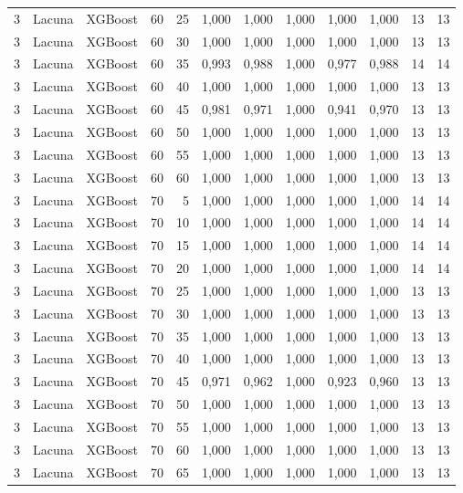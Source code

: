 \begin{longtable}{@{}rllrrrrrrrrr@{}}
3 & Lacuna & XGBoost & 60 & 25 & 1,000 & 1,000 & 1,000 & 1,000 & 1,000 & 13 & 13 \\
3 & Lacuna & XGBoost & 60 & 30 & 1,000 & 1,000 & 1,000 & 1,000 & 1,000 & 13 & 13 \\
3 & Lacuna & XGBoost & 60 & 35 & 0,993 & 0,988 & 1,000 & 0,977 & 0,988 & 14 & 14 \\
3 & Lacuna & XGBoost & 60 & 40 & 1,000 & 1,000 & 1,000 & 1,000 & 1,000 & 13 & 13 \\
3 & Lacuna & XGBoost & 60 & 45 & 0,981 & 0,971 & 1,000 & 0,941 & 0,970 & 13 & 13 \\
3 & Lacuna & XGBoost & 60 & 50 & 1,000 & 1,000 & 1,000 & 1,000 & 1,000 & 13 & 13 \\
3 & Lacuna & XGBoost & 60 & 55 & 1,000 & 1,000 & 1,000 & 1,000 & 1,000 & 13 & 13 \\
3 & Lacuna & XGBoost & 60 & 60 & 1,000 & 1,000 & 1,000 & 1,000 & 1,000 & 13 & 13 \\
3 & Lacuna & XGBoost & 70 & 5 & 1,000 & 1,000 & 1,000 & 1,000 & 1,000 & 14 & 14 \\
3 & Lacuna & XGBoost & 70 & 10 & 1,000 & 1,000 & 1,000 & 1,000 & 1,000 & 14 & 14 \\
3 & Lacuna & XGBoost & 70 & 15 & 1,000 & 1,000 & 1,000 & 1,000 & 1,000 & 14 & 14 \\
3 & Lacuna & XGBoost & 70 & 20 & 1,000 & 1,000 & 1,000 & 1,000 & 1,000 & 14 & 14 \\
3 & Lacuna & XGBoost & 70 & 25 & 1,000 & 1,000 & 1,000 & 1,000 & 1,000 & 13 & 13 \\
3 & Lacuna & XGBoost & 70 & 30 & 1,000 & 1,000 & 1,000 & 1,000 & 1,000 & 13 & 13 \\
3 & Lacuna & XGBoost & 70 & 35 & 1,000 & 1,000 & 1,000 & 1,000 & 1,000 & 13 & 13 \\
3 & Lacuna & XGBoost & 70 & 40 & 1,000 & 1,000 & 1,000 & 1,000 & 1,000 & 13 & 13 \\
3 & Lacuna & XGBoost & 70 & 45 & 0,971 & 0,962 & 1,000 & 0,923 & 0,960 & 13 & 13 \\
3 & Lacuna & XGBoost & 70 & 50 & 1,000 & 1,000 & 1,000 & 1,000 & 1,000 & 13 & 13 \\
3 & Lacuna & XGBoost & 70 & 55 & 1,000 & 1,000 & 1,000 & 1,000 & 1,000 & 13 & 13 \\
3 & Lacuna & XGBoost & 70 & 60 & 1,000 & 1,000 & 1,000 & 1,000 & 1,000 & 13 & 13 \\
3 & Lacuna & XGBoost & 70 & 65 & 1,000 & 1,000 & 1,000 & 1,000 & 1,000 & 13 & 13 \\

\end{longtable}
